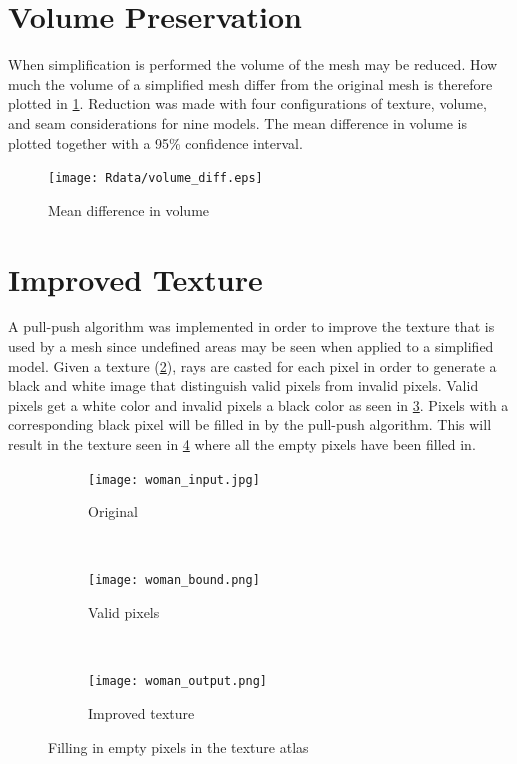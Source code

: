 \clearpage
        
\section{Volume Preservation}
When simplification is performed the volume of the mesh may be reduced. How much the volume of a simplified mesh differ from the original mesh is therefore plotted in \cref{fig:volume_diff}. Reduction was made with four configurations of texture, volume, and seam considerations for nine models. The mean difference in volume is plotted together with a 95\% confidence interval.

\begin{figure}[ht]
  \centering
  \texttt{[image: Rdata/volume\_diff.eps]}
  \caption{Mean difference in volume}
  \label{fig:volume_diff}
\end{figure}

\clearpage

\section{Improved Texture}
A pull-push algorithm was implemented in order to improve the texture that is used by a mesh since undefined areas may be seen when applied to a simplified model. Given a texture (\cref{fig:original_texture_atlas}), rays are casted for each pixel in order to generate a black and white image that distinguish valid pixels from invalid pixels. Valid pixels get a white color and invalid pixels a black color as seen in \cref{fig:valid_pixels}. Pixels with a corresponding black pixel will be filled in by the pull-push algorithm. This will result in the texture seen in \cref{fig:improved_texture} where all the empty pixels have been filled in.

\begin{figure}[ht]
  \centering
  \begin{subfigure}[b]{.3\textwidth} 
    \texttt{[image: woman\_input.jpg]}
    \caption{Original}
    \label{fig:original_texture_atlas}
  \end{subfigure}
  ~
  \begin{subfigure}[b]{.3\textwidth}
    \texttt{[image: woman\_bound.png]}
    \caption{Valid pixels}
    \label{fig:valid_pixels}
  \end{subfigure}
  ~
  \begin{subfigure}[b]{.3\textwidth}
    \texttt{[image: woman\_output.png]}
    \caption{Improved texture}
    \label{fig:improved_texture}
  \end{subfigure}
  \caption{Filling in empty pixels in the texture atlas}
  \label{fig:improve_texture_atlas}
\end{figure}

